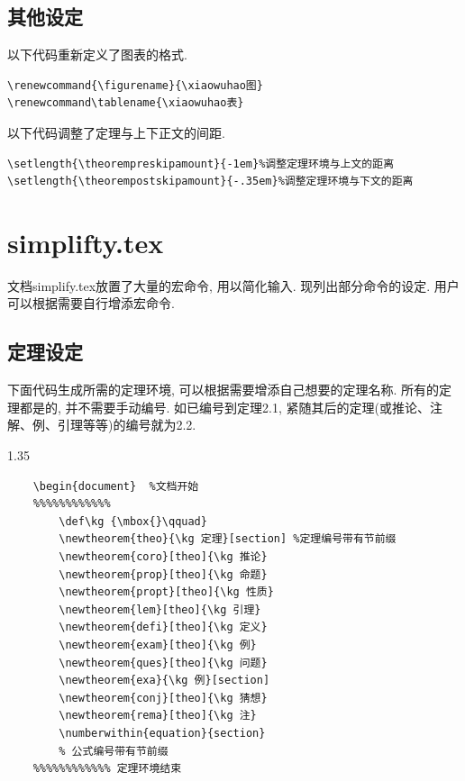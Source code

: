 \documentclass[a4paper,12pt,twoside]{ctexart}
\begin{document}
    \vspace*{-25pt}
    \subsection{其他设定}
以下代码重新定义了图表的格式.
    \begin{verbatim}
\renewcommand{\figurename}{\xiaowuhao图}
\renewcommand\tablename{\xiaowuhao表}
    \end{verbatim}\vspace*{0pt}

    \vspace*{-25pt}以下代码调整了定理与上下正文的间距.\vspace*{-10pt}
    \begin{verbatim}
\setlength{\theorempreskipamount}{-1em}%调整定理环境与上文的距离
\setlength{\theorempostskipamount}{-.35em}%调整定理环境与下文的距离
    \end{verbatim}\vspace*{-0pt}

\vspace*{-30pt}


\section{simplifty.tex}
    文档simplify.tex放置了大量的宏命令, 用以简化输入. 现列出部分命令的设定. 用户可以根据需要自行增添宏命令.
    \subsection{定理设定}
    下面代码生成所需的定理环境, 可以根据需要增添自己想要的定理名称. 所有的定理都是的, 并不需要手动编号. 如已编号到定理2.1, 紧随其后的定理(或推论、注解、例、引理等等)的编号就为2.2.
    \begin{spacing}{1.35}
    \begin{verbatim}
    \begin{document}  %文档开始
    %%%%%%%%%%%%
        \def\kg {\mbox{}\qquad}
        \newtheorem{theo}{\kg 定理}[section] %定理编号带有节前缀
        \newtheorem{coro}[theo]{\kg 推论}
        \newtheorem{prop}[theo]{\kg 命题}
        \newtheorem{propt}[theo]{\kg 性质}
        \newtheorem{lem}[theo]{\kg 引理}
        \newtheorem{defi}[theo]{\kg 定义}
        \newtheorem{exam}[theo]{\kg 例}
        \newtheorem{ques}[theo]{\kg 问题}
        \newtheorem{exa}{\kg 例}[section]
        \newtheorem{conj}[theo]{\kg 猜想}
        \newtheorem{rema}[theo]{\kg 注}
        \numberwithin{equation}{section}
        % 公式编号带有节前缀
    %%%%%%%%%%%% 定理环境结束
    \end{verbatim}
    \end{spacing}\vspace*{-0pt}
\end{document}
